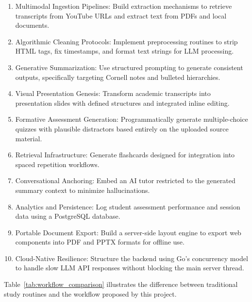 \begin{enumerate}
    \item Multimodal Ingestion Pipelines: Build extraction mechanisms to retrieve transcripts from YouTube URLs and extract text from PDFs and local documents.
    \item Algorithmic Cleaning Protocols: Implement preprocessing routines to strip HTML tags, fix timestamps, and format text strings for LLM processing.
    \item Generative Summarization: Use structured prompting to generate consistent outputs, specifically targeting Cornell notes and bulleted hierarchies.
    \item Visual Presentation Genesis: Transform academic transcripts into presentation slides with defined structures and integrated inline editing.
    \item Formative Assessment Generation: Programmatically generate multiple-choice quizzes with plausible distractors based entirely on the uploaded source material.
    \item Retrieval Infrastructure: Generate flashcards designed for integration into spaced repetition workflows.
    \item Conversational Anchoring: Embed an AI tutor restricted to the generated summary context to minimize hallucinations.
    \item Analytics and Persistence: Log student assessment performance and session data using a PostgreSQL database.
    \item Portable Document Export: Build a server-side layout engine to export web components into PDF and PPTX formats for offline use.
    \item Cloud-Native Resilience: Structure the backend using Go's concurrency model to handle slow LLM API responses without blocking the main server thread.
\end{enumerate}

Table~\ref{tab:workflow_comparison} illustrates the difference between traditional study routines and the workflow proposed by this project.

